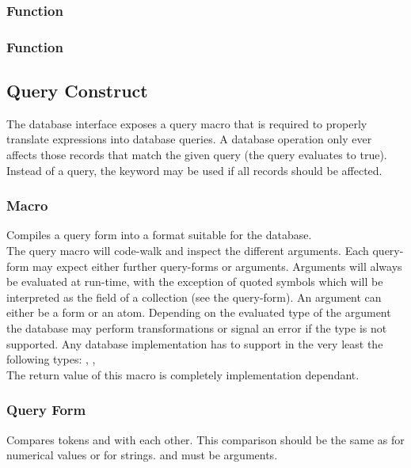 \subsubsection{Function }

\subsubsection{Function }

\subsection{Query Construct}
The database interface exposes a query macro that is required to properly translate expressions into database queries. A database operation only ever affects those records that match the given query (the query evaluates to true). Instead of a query, the  keyword may be used if all records should be affected.

\subsubsection{Macro }
Compiles a query form into a format suitable for the database. \\

The query macro will code-walk and inspect the different arguments. Each query-form may expect either further query-forms or arguments. Arguments will always be evaluated at run-time, with the exception of quoted symbols which will be interpreted as the field of a collection (see the  query-form). An argument can either be a form or an atom. Depending on the evaluated type of the argument the database may perform transformations or signal an error if the type is not supported. Any database implementation has to support in the very least the following types: , ,  \\

The return value of this macro is completely implementation dependant.
\subsubsection{Query Form \inline{:=}}
Compares tokens  and  with each other. This comparison should be the same as  for numerical values or  for strings.  and  must be arguments.
